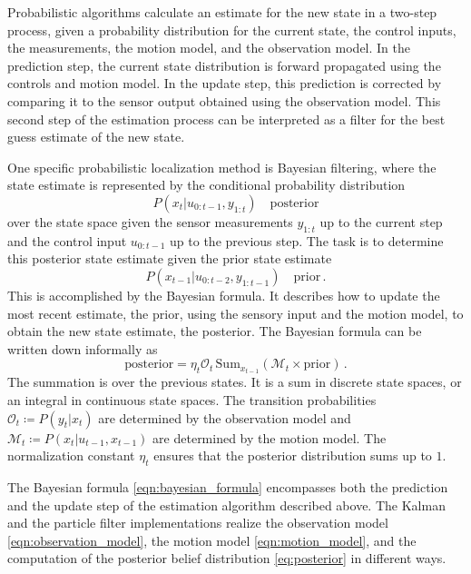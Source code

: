 \documentclass[10pt,journal,compsoc]{IEEEtran}
\begin{document}
Probabilistic algorithms calculate an estimate for the new state in a two-step process, given a probability distribution for the current state, the control inputs, the measurements, the motion model, and the observation model. In the prediction step, the current state distribution is forward propagated using the controls and motion model. In the update step, this prediction is corrected by comparing it to the sensor output obtained using the observation model. This second step of the estimation process can be interpreted as a filter for the best guess estimate of the new state. 

One specific probabilistic localization method is Bayesian filtering, where the state estimate is represented by the conditional probability distribution 
\begin{equation}
\label{eq:posterior}
P\left( x_t \vert u_{0:t-1}, y_{1:t}\right) \quad \mathrm{posterior}
\end{equation}
over the state space given the sensor measurements $y_{1:t}$ up to the current step and the control input $u_{0:t-1}$ up to the previous step. The task is to determine this posterior state estimate given the prior state estimate 
\begin{equation}
\label{eqn:prior}
P\left( x_{t-1} \vert u_{0:t-2}, y_{1:t-1}\right) \quad \mathrm{prior} \, .
\end{equation}
This is accomplished by the Bayesian formula. It describes how to update the most recent estimate, the prior, using the sensory input and the motion model, to obtain the new state estimate, the posterior. The Bayesian formula can be written down informally as
\begin{equation}
\label{eqn:bayesian_formula}
\mathrm{posterior}  =  \eta_t \mathcal{O}_t \, \mathrm{Sum}_{x_{t-1}} \left( \mathcal{M}_t \times \mathrm{prior}\right) \, .
\end{equation}
The summation is over the previous states. It is a sum in discrete state spaces, or an integral in continuous state spaces. The transition probabilities $\mathcal{O}_t \coloneqq P \left( y_t \vert x_t \right)$ are determined by the observation model and $\mathcal{M}_t \coloneqq P \left( x_t \vert u_{t-1}, x_{t-1} \right)$ are determined by the motion model. The normalization constant $\eta_t$ ensures that the posterior distribution sums up to $1$.

The Bayesian formula \ref{eqn:bayesian_formula} encompasses both the prediction and the update step of the estimation algorithm described above. The Kalman and the particle filter implementations realize the observation model \ref{eqn:observation_model}, the motion model \ref{eqn:motion_model}, and the computation of the posterior belief distribution \ref{eq:posterior} in different ways.
\end{document}
